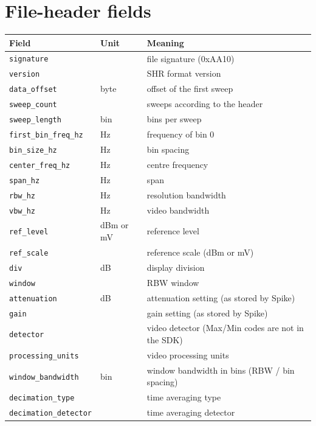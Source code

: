 \documentclass[11pt,a4paper]{article}
\begin{document}
\section{File-header fields}
\begin{longtable}{p{4.4cm}p{2.2cm}p{8.6cm}}
\toprule
\textbf{Field} & \textbf{Unit} & \textbf{Meaning}\\
\midrule
\endhead
\texttt{signature} &  & file signature (0xAA10)\\
\texttt{version} &  & SHR format version\\
\texttt{data\_\allowbreak{}offset} & byte & offset of the first sweep\\
\texttt{sweep\_\allowbreak{}count} &  & sweeps according to the header\\
\texttt{sweep\_\allowbreak{}length} & bin & bins per sweep\\
\texttt{first\_\allowbreak{}bin\_\allowbreak{}freq\_\allowbreak{}hz} & Hz & frequency of bin 0\\
\texttt{bin\_\allowbreak{}size\_\allowbreak{}hz} & Hz & bin spacing\\
\texttt{center\_\allowbreak{}freq\_\allowbreak{}hz} & Hz & centre frequency\\
\texttt{span\_\allowbreak{}hz} & Hz & span\\
\texttt{rbw\_\allowbreak{}hz} & Hz & resolution bandwidth\\
\texttt{vbw\_\allowbreak{}hz} & Hz & video bandwidth\\
\texttt{ref\_\allowbreak{}level} & dBm or mV & reference level\\
\texttt{ref\_\allowbreak{}scale} &  & reference scale (dBm or mV)\\
\texttt{div} & dB & display division\\
\texttt{window} &  & RBW window\\
\texttt{attenuation} & dB & attenuation setting (as stored by Spike)\\
\texttt{gain} &  & gain setting (as stored by Spike)\\
\texttt{detector} &  & video detector (Max/Min codes are not in the SDK)\\
\texttt{processing\_\allowbreak{}units} &  & video processing units\\
\texttt{window\_\allowbreak{}bandwidth} & bin & window bandwidth in bins (RBW / bin spacing)\\
\texttt{decimation\_\allowbreak{}type} &  & time averaging type\\
\texttt{decimation\_\allowbreak{}detector} &  & time averaging detector\\

\end{longtable}
\end{document}
